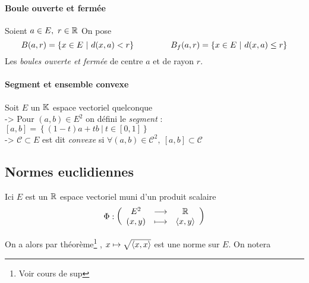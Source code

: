 			
		\traitd
		\paragraph{Boule ouverte et fermée} Soient $a\in E,~r\in{\mathbb{R}}$ On pose
			\[B(a,r) = \left\{ x\in E ~|~ d(x,a)<r\right\} \hspace*{1.5cm} B_f (a,r) = \left\{ x\in E ~|~ d(x,a) \leq r\right\}\]
			\hspace*{0.6cm} Les \emph{boules ouverte et fermée} de centre $a$ et de rayon $r$. 
		\trait
		
		\newpage
		
		\traitd
		\paragraph{Segment et ensemble convexe} Soit $E$ un ${\mathbb{K}}$ espace vectoriel quelconque \vspace*{0.2cm}\\
			\hspace*{0.5cm} -> Pour $(a,b)\in E^2$ on défini le \emph{segment} : $[a,b]=\left\{ (1-t)a +tb ~\vert ~t\in [0,1]\right\}$ \\
			\hspace*{0.5cm} -> $\mathcal{C} \subset E$ est dit \emph{convexe} si $\forall (a,b)\in \mathcal{C}^2,~[a,b]\subset \mathcal{C}$
		\trait 
		
		 \medskip
		

	\subsection{Normes euclidiennes}
		Ici $E$ est un ${\mathbb{R}}$ espace vectoriel muni d'un produit scalaire\footnotemark[1] 
		\[
			\Phi :  \left( \begin{array}{ccc} E^2 & \longrightarrow & {\mathbb{R}} \\ (x,y) & \longmapsto & \left< x,y \right> \end{array} \right)
		\]
			
		
		On a alors par théorème\footnote[2]{Voir cours de sup} ,  $x\mapsto \sqrt{\left< x,x \right>}$ est une norme sur $E$.  
		On notera \begin{center}  \end{center} 
		
